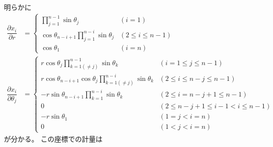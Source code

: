 明らかに
\begin{subequations}
\begin{align}
    \dfrac{\partial x_i}
        {\partial r}
&=
    \begin{cases}
    \displaystyle
        \prod_{j=1}^{n - 1}
        \sin \theta_j
    &(i = 1)
    \\
    \displaystyle
        \cos \theta_{n - i + 1}
        \prod_{j=1}^{n - i}
        \sin \theta_j
    &(2 \le i \le n - 1)
    \\
    \displaystyle
        \cos \theta_{1}
    &(i = n)
    \end{cases}
\\
    \dfrac{\partial x_i}
        {\partial \theta_j}
&=
    \begin{cases}
    \displaystyle
        r \cos \theta_j
        \prod_{k=1 (\neq j)}^{n-1}
        \sin \theta_k
    &(i = 1 \le j \le n - 1)
    \\
    \displaystyle
        r \cos \theta_{n - i + 1}
        \cos \theta_j
        \prod_{k=1 (\neq j)}^{n - i}
        \sin \theta_k
    &(2 \le i \le n - j \le n - 1)
    \\
    \displaystyle
        -
        r \sin \theta_{n - i + 1}
        \prod_{k=1}^{n - i}
        \sin \theta_k
    &(2 \le i = n - j + 1 \le n - 1)
    \\
    \displaystyle
        0
    &(2 \le n-j+1 \le i - 1 < i \le n - 1)
    \\
    \displaystyle
        -
        r \sin \theta_1
    &(1 = j < i = n)
    \\
    \displaystyle
        0
    &(1 < j < i = n)
    \end{cases}
\end{align}
\end{subequations}
が分かる。
この座標での計量は
